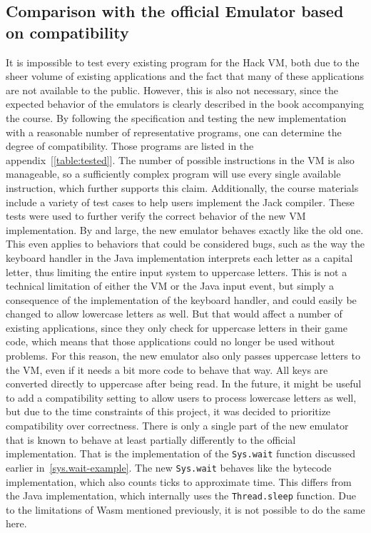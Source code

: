 \subsection{Comparison with the official Emulator based on compatibility} \label{compatibility}
It is impossible to test every existing program for the Hack VM, both due to the sheer volume of existing applications and the fact that many of these applications are not available to the public.
However, this is also not necessary, since the expected behavior of the emulators is clearly described in the book accompanying the course.
By following the specification and testing the new implementation with a reasonable number of representative programs, one can determine the degree of compatibility.
Those programs are listed in the appendix~[\ref{table:tested}].
The number of possible instructions in the VM is also manageable, so a sufficiently complex program will use every single available instruction, which further supports this claim.
Additionally, the course materials include a variety of test cases to help users implement the Jack compiler.
These tests were used to further verify the correct behavior of the new VM implementation.
By and large, the new emulator behaves exactly like the old one.
This even applies to behaviors that could be considered bugs, such as the way the keyboard handler in the Java implementation interprets each letter as a capital letter, thus limiting the entire input system to uppercase letters.
This is not a technical limitation of either the VM or the Java input event, but simply a consequence of the implementation of the keyboard handler, and could easily be changed to allow lowercase letters as well.
But that would affect a number of existing applications, since they only check for uppercase letters in their game code, which means that those applications could no longer be used without problems.
For this reason, the new emulator also only passes uppercase letters to the VM, even if it needs a bit more code to behave that way.
All keys are converted directly to uppercase after being read.
In the future, it might be useful to add a compatibility setting to allow users to process lowercase letters as well, but due to the time constraints of this project, it was decided to prioritize compatibility over correctness.
There is only a single part of the new emulator that is known to behave at least partially differently to the official implementation.
That is the implementation of the \verb+Sys.wait+ function discussed earlier in~\cref{sys.wait-example}.
The new \verb+Sys.wait+ behaves like the bytecode implementation, which also counts ticks to approximate time.
This differs from the Java implementation, which internally uses the \verb+Thread.sleep+ function.
Due to the limitations of Wasm mentioned previously, it is not possible to do the same here.

